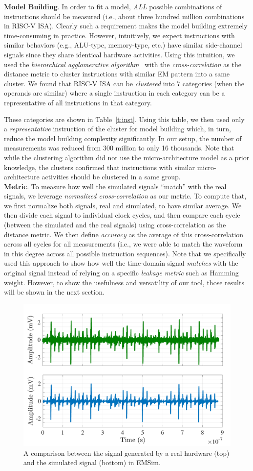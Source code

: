 \documentclass[11 pt]{article}
\begin{document}
\noindent\textbf{Model Building}. In order to fit a model, \textit{ALL} possible combinations of instructions should be measured (i.e., about three hundred million combinations in RISC-V ISA). Clearly such a requirement makes the model building extremely time-consuming in practice.  However, intuitively, we expect instructions with similar behaviors (e.g., ALU-type, memory-type, etc.) have similar side-channel signals since they share identical hardware activities. Using this intuition, we used the \textit{hierarchical agglomerative algorithm}~\cite{frakes1992information} with the \textit{cross-correlation} as the distance metric to cluster instructions with similar EM pattern into a same cluster. We found that RISC-V ISA can be \textit{clustered} into 7 categories (when the operands are similar) where a single instruction in each category can be a representative of all instructions in that category.

These categories are shown in Table~\ref{t:inst}. Using this table, we then used only a \textit{representative} instruction of the cluster for model building which, in turn, reduce the model building complexity significantly. In our setup, the number of measurements was reduced from 300 million to only 16 thousands.  Note that while the clustering algorithm did not use the micro-architecture model as a prior knowledge, the clusters confirmed that instructions with similar micro-architecture activities should be clustered in a same group. \\

\noindent\textbf{Metric}. To measure how well the simulated signals ``match'' with the real signals, we leverage \textit{normalized cross-correlation} as our metric. To compute that, we first normalize both signals, real and simulated, to have similar average. We then divide each signal to individual clock cycles, and then compare each cycle (between the simulated and the real signals) using cross-correlation as the distance metric. We then define \textit{accuracy} as the average of this cross-correlation across all cycles for all measurements (i.e., we were able to match the waveform in this degree across all possible instruction sequences). Note that we specifically used this approach to show how well the time-domain signal \textit{matches} with the original signal instead of relying on a specific \textit{leakage metric} such as Hamming weight. However, to show the usefulness and versatility of our tool, those results will be shown in the next section.
\begin{figure}
	\centering
	\includegraphics[width=0.4\columnwidth,clip]{figure/bench.pdf}
	\caption{A comparison between the signal generated by a real hardware (top) and the simulated signal (bottom) in EMSim.}
	\label{fig:bench}
\end{figure}
\end{document}
